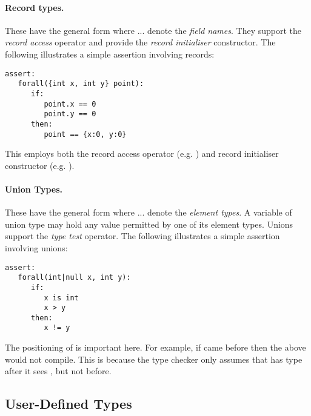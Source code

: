 \paragraph{Record types.} These have the general form  where  ...  denote the
{\em field names}.  They support the {\em record access} operator and
provide the {\em record initialiser} constructor.  The following
illustrates a simple assertion involving records:

\begin{tcolorbox}\begin{lstlisting}[language=WyAL]
assert:
   forall({int x, int y} point):
      if:
         point.x == 0
         point.y == 0
      then:
         point == {x:0, y:0}
\end{lstlisting}\end{tcolorbox}

This employs both the record access operator
(e.g. ) and record initialiser constructor
(e.g. ).

\paragraph{Union Types.}  These have the general form  where  ...  denote the
{\em element types}.  A variable of union type may hold any value
permitted by one of its element types.  Unions support the {\em type
  test} operator.  The following illustrates a simple assertion
involving unions:
\begin{tcolorbox}\begin{lstlisting}[language=WyAL]
assert:
   forall(int|null x, int y):
      if:
         x is int
         x > y
      then:
         x != y
\end{lstlisting}\end{tcolorbox}
The positioning of  is important here.  For
example, if  came before 
then the above would not compile.  This is because the type checker
only assumes that  has type  after it sees
, but not before.

\subsection{User-Defined Types}
 
